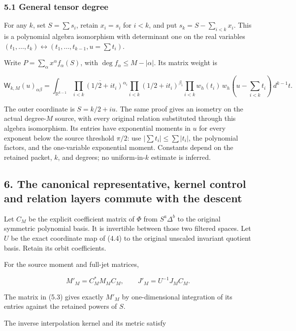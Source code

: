 \documentclass[
]{article}
\begin{document}
\subsubsection{5.1 General tensor degree}\label{general-tensor-degree}

For any \(k\), set \(S=\sum s_i\), retain \(x_i=s_i\) for \(i<k\), and
put \(s_k=S-\sum_{i<k}x_i\). This is a polynomial algebra isomorphism
with determinant one on the real variables
\((t_1,\ldots,t_k)\leftrightarrow(t_1,\ldots,t_{k-1},u=\sum t_i)\).

Write \(P=\sum_\alpha x^\alpha f_\alpha(S)\), with
\(\deg f_\alpha\le M-|\alpha|\). Its matrix weight is

\[\mathsf W_{k,M}(u)_{\alpha\beta}
=\int_{\mathbb R^{k-1}}\overline{\prod_{i<k}(1/2+it_i)^{\alpha_i}}
\prod_{i<k}(1/2+it_i)^{\beta_i}
\prod_{i<k}w_h(t_i)\,w_h(u-\sum_{i<k}t_i)\,d^{k-1}t.\tag{5.6}\]

The outer coordinate is \(S=k/2+iu\). The same proof gives an isometry
on the actual degree-\(M\) source, with every original relation
substituted through this algebra isomorphism. Its entries have
exponential moments in \(u\) for every exponent below the source
threshold \(\pi/2\): use \(|\sum t_i|\le\sum|t_i|\), the polynomial
factors, and the one-variable exponential moment. Constants depend on
the retained packet, \(k\), and degrees; no uniform-in-\(k\) estimate is
inferred.

\subsection{6. The canonical representative, kernel control and relation
layers commute with the
descent}\label{the-canonical-representative-kernel-control-and-relation-layers-commute-with-the-descent}

Let \(C_M\) be the explicit coefficient matrix of \(\Phi\) from
\(S^a\Delta^b\) to the original symmetric polynomial basis. It is
invertible between those two filtered spaces. Let \(U\) be the exact
coordinate map of (4.4) to the original unscaled invariant quotient
basis. Retain its orbit coefficients.

For the source moment and full-jet matrices,

\[M'_M=C_M^*M_M C_M,\qquad J'_M=U^{-1}J_MC_M.\tag{6.1}\]

The matrix in (5.3) gives exactly \(M'_M\) by one-dimensional
integration of its entries against the retained powers of \(S\).

The inverse interpolation kernel and its metric satisfy
\end{document}
